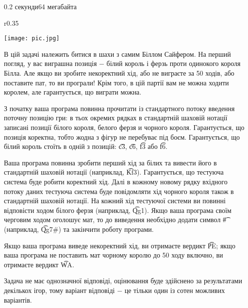 \begin{problem}{}{}{}{0.2 секунди}{64 мегабайта}

\begin{wrapfigure}{r}{0.35\textwidth}
\vspace{-20pt}
  \begin{center}
    \texttt{[image: pic.jpg]}
  \end{center}
  \vspace{-20pt}
  \vspace{1pt}
\end{wrapfigure}

В цій задачі належить битися в шахи з самим Біллом Сайфером.
На перший погляд, у вас виграшна позиція $-$ білий король і ферзь проти одинокого короля Білла.
Але якщо ви зробите некоректний хід, або не виграєте за 50 ходів, або поставите пат, то ви програли!
Крім того, в цій партії  вам не можна ходити королем, але гарантується, що виграти можна.

\InputFile
З початку ваша програма повинна прочитати із стандартного потоку введення  поточну позицію гри:
в тьох окремих рядках в стандартній шаховій нотації записані позиції білого короля, белого ферзя и чорного короля.
Гарантується, що позиція коректна, тобто жодна з фігур не перебуває під боєм.
Гарантується, що білий король стоїть в одній з позицій: {\t{c3}}, {\t{c6}}, {\t{f3}} або {\t{f6}}.

\OutputFile
Ваша програма повинна зробити перший хід за білих та вивести його в стандартній шаховій нотації (наприклад, {\t{Kf3}}).
Гарантується, що тестуюча система буде робити коректний хід.
Далі в кожному новому рядку вхідного потоку даних тестуюча  система буде повідомляти хід чорного короля 
також в стандартній шаховій нотації. На кожний хід тестуючої системи ви повинні відповісти ходом білого ферзя (наприклад, {\t{Qg1}}). 
Якщо ваша програма своїм черговим ходом оголошує мат, то до виведення необхідно додати символ {\t{\#}}
(наприклад, {\t{Qg7\#}}) та  закінчити роботу програми.

Якщо ваша програма виведе  некоректний хід, ви отримаєте вердикт {\t{PE}}; якщо ваша програма 
не поставить мат чорному королю до 50 ходу включно, ви отримаєте  вердикт {\t{WA}}.

\Example
\begin{example}
%
\end{example}

\Note
Задача не має однозначної відповіді,  оцінювання буде здійснено за результатами декількох ігор,
тому варіант відповіді  $-$ це тільки один із сотен можливих  варіантів.

\end{problem}

